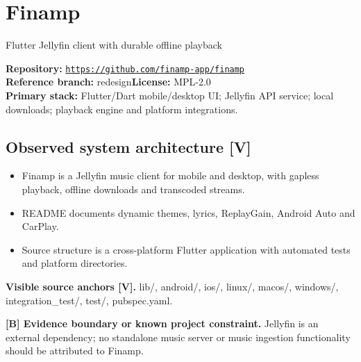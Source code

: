 \documentclass[10pt,a4paper,oneside]{report}
\newcommand{\tagboundary}{\textbf{[B] Evidence boundary or known project constraint.}}
\newcommand{\sourceurl}[1]{\href{#1}{\texttt{\nolinkurl{#1}}}}
\begin{document}
\chapter{Finamp}
{\large\color{muted}Flutter Jellyfin client with durable offline playback}\par
\begin{evidencebox}\small\textbf{Repository:} \sourceurl{https://github.com/finamp-app/finamp}\\\textbf{Reference branch:} redesign\qquad \textbf{License:} MPL-2.0\\\textbf{Primary stack:} Flutter/Dart mobile/desktop UI; Jellyfin API service; local downloads; playback engine and platform integrations.\end{evidencebox}
\section{Observed system architecture [V]}
\begin{itemize}[leftmargin=*,itemsep=2pt,topsep=3pt]
\item Finamp is a Jellyfin music client for mobile and desktop, with gapless playback, offline downloads and transcoded streams.
\item README documents dynamic themes, lyrics, ReplayGain, Android Auto and CarPlay.
\item Source structure is a cross-platform Flutter application with automated tests and platform directories.
\end{itemize}
\textbf{Visible source anchors [V].} lib/, android/, ios/, linux/, macos/, windows/, integration\_test/, test/, pubspec.yaml.\par
\begin{evidencebox}\tagboundary{} Jellyfin is an external dependency; no standalone music server or music ingestion functionality should be attributed to Finamp.\end{evidencebox}
\end{document}
